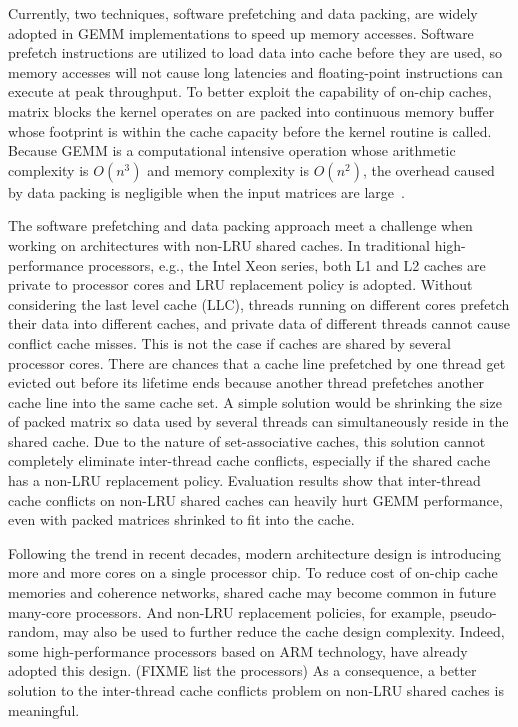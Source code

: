 Currently, two techniques, software prefetching and data packing,
are widely adopted in GEMM implementations to speed up memory accesses.
Software prefetch instructions are utilized
to load data into cache before they are used, so memory accesses will not
cause long latencies and floating-point instructions can execute at peak throughput.
To better exploit the capability of on-chip caches,
matrix blocks the kernel operates on are packed into continuous memory buffer
whose footprint is within the cache capacity before the kernel routine is called.
Because GEMM is a computational intensive operation whose
arithmetic complexity is $O(n^3)$ and memory complexity is $O(n^2)$,
the overhead caused by data packing is negligible when
the input matrices are large~\cite{gotogemm}.

The software prefetching and data packing approach meet a challenge
when working on architectures with non-LRU shared caches.
In traditional high-performance processors, e.g., the Intel Xeon series,
both L1 and L2 caches are private to processor cores
and LRU replacement policy is adopted.
Without considering the last level cache (LLC),
threads running on different cores prefetch their data into
different caches, and private data of different threads
cannot cause conflict cache misses.
This is not the case if caches are shared by several processor cores.
There are chances that a cache line prefetched by one thread
get evicted out before its lifetime ends because another thread prefetches
another cache line into the same cache set.
A simple solution would be shrinking the size of packed matrix
so data used by several threads can simultaneously reside in the shared cache.
Due to the nature of set-associative caches,
this solution cannot completely eliminate inter-thread cache conflicts,
especially if the shared cache has a non-LRU replacement policy.
Evaluation results show that inter-thread cache conflicts on non-LRU shared caches
can heavily hurt GEMM performance,
even with packed matrices shrinked to fit into the cache.

Following the trend in recent decades, modern architecture design
is introducing more and more cores on a single processor chip.
To reduce cost of on-chip cache memories and coherence networks,
shared cache may become common in future many-core processors.
And non-LRU replacement policies, for example, pseudo-random,
may also be used to further reduce the cache design complexity.
Indeed, some high-performance processors based on ARM technology,
have already adopted this design. (FIXME list the processors)
As a consequence, a better solution to the inter-thread cache conflicts problem
on non-LRU shared caches is meaningful.

